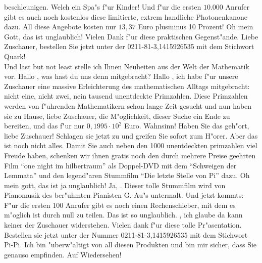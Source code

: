 \begin{verseplay}[5em]
                beschleunigen. Welch ein Spa"s f"ur Kinder!
\s{\QEDGuestB} Und f"ur die ersten $10.000$ Anrufer gibt es auch noch 
                kostenlos diese limitierte, extrem handliche Photonenkanone dazu. 
                All diese Angebote kosten nur $13,37$ Euro plusminus 10 Prozent!
\s{\QEDHost} Oh mein Gott, das ist unglaublich! Vielen Dank f"ur diese 
                praktischen Gegenst"ande. Liebe Zuschauer, bestellen Sie jetzt 
                unter der 0211-81-3,1415926535 mit dem Stichwort Quark!
                \\
                Und last but not least stelle ich Ihnen Neuheiten aus der Welt der 
                Mathematik vor. Hallo \QEDGuestC, was hast du uns denn mitgebracht?
\s{\QEDGuestC} Hallo \QEDHost, ich habe f"ur unsere Zuschauer eine massive 
                Erleichterung des mathematischen Alltags mitgebracht: nicht eine,
                nicht zwei, nein tausend unentdeckte Primzahlen. Diese Primzahlen 
                werden von f"uhrenden Mathematikern schon lange Zeit gesucht und 
                nun haben sie zu Hause, liebe Zuschauer, die M"oglichkeit, dieser 
                Suche ein Ende zu bereiten, und das f"ur nur $0,1995\cdot10^2$ Euro. 
\s{\QEDHost} Wahnsinn! Haben Sie das geh"ort, liebe Zuschauer! Schlagen sie 
                jetzt zu und greifen Sie sofort zum H"orer.
\s{\QEDGuestC} Aber das ist noch nicht alles. Damit Sie auch neben den 1000 
                unentdeckten primzahlen viel Freude haben, schenken wir ihnen 
                gratis noch den durch mehrere Preise geehrten Film "`one night im 
                hilbertraum"' als Doppel-DVD mit dem "`Schweigen der Lemmata"' und 
                den legend"aren Stummfilm "`Die letzte Stelle von Pi"' dazu. 
\s{\QEDHost} Oh mein gott, das ist ja unglaublich!
\s{\QEDGuestC} Ja, \QEDHost. Dieser tolle Stummfilm wird von Pianomusik des 
                ber"uhmten Pianisten G. Au"s untermalt. Und jetzt kommts: F"ur die 
                ersten 100 Anrufer gibt es noch einen Rechenschieber, mit dem es 
                m"oglich ist durch null zu teilen.
\s{\QEDHost} Das ist so unglaublich. \QEDGuestC, ich glaube da kann keiner 
                der Zuschauer widerstehen. Vielen dank f"ur diese tolle 
                Pr"asentation. Bestellen sie jetzt unter der Nummer 
                0211-81-3,1415926535 mit dem Stichwort Pi-Pi.
                Ich bin "uberw"altigt von all diesen Produkten und bin mir sicher, 
                dass Sie genauso empfinden. Auf Wiedersehen!
\end{verseplay}
%
